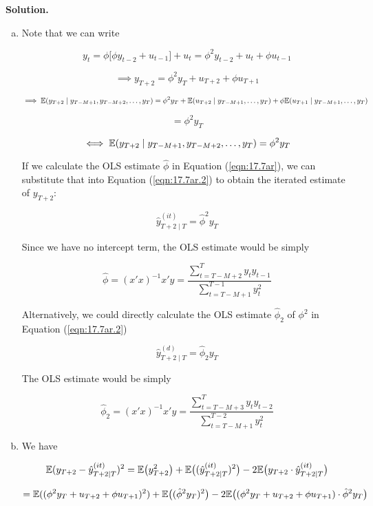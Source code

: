 \textbf{Solution.} 

\begin{enumerate}[(a)]

\item Note that we can write

\[
y_t =  \phi \big[\phi y_{t-2} + u_{t-1} \big] + u_t =  \phi^2y_{t-2} + u_t + \phi u_{t-1}
\]

\[
\implies y_{T+2} =  \phi^2y_{T} + u_{T+2} + \phi u_{T+1}
\]

\[
\implies \mathbb{E}(y_{T+2} \mid y_{T - M + 1}, y_{T-M + 2}, \ldots, y_T) =  \phi^2y_{T} +  \mathbb{E}(u_{T+2} \mid y_{T - M + 1}, \ldots, y_T) + \phi  \mathbb{E}( u_{T+1} \mid y_{T - M + 1}, \ldots, y_T)
\]

\[
 = \phi^2y_{T}
\]

\begin{equation} \label{eqn:17.7ar.2}
\iff  \mathbb{E}(y_{T+2} \mid y_{T - M + 1}, y_{T-M + 2}, \ldots, y_T) = \phi^2y_{T}
\end{equation}

If we calculate the OLS estimate \(\hat{\phi}\) in Equation (\ref{eqn:17.7ar}), we can substitute that into Equation (\ref{eqn:17.7ar.2}) to obtain the iterated estimate of \(y_{T+2}\):

\[
\hat{y}_{T+2\mid T}^{(it)} = \hat{\phi}^2y_{T}
\]

Since we have no intercept term, the OLS estimate would be simply

\[
\hat{\phi} = (x'x)^{-1}x'y = \frac{\sum_{t=T-M+2}^{T} y_t y_{t-1}}{\sum_{t=T-M+1}^{T-1} y_t^2}
\]

Alternatively, we could directly calculate the OLS estimate \(\hat{\phi}_2\) of \(\phi^2\) in Equation (\ref{eqn:17.7ar.2})

\[
\hat{y}_{T+2\mid T}^{(d)} = \hat{\phi}_2y_{T}
\]

The OLS estimate would be simply

\[
\hat{\phi}_2 = (x'x)^{-1}x'y = \frac{\sum_{t=T-M+3}^{T} y_t y_{t-2}}{\sum_{t=T-M+1}^{T-2} y_t^2}
\]

\item We have

\[
\mathbb{E}(y_{T+2} - \hat{y}_{T+2\mid T}^{(it)})^2 = \mathbb{E}\big(y_{T+2}^2\big) + \mathbb{E} \big((\hat{y}_{T+2\mid T}^{(it)})^2 \big)  -2 \mathbb{E} \big(y_{T+2} \cdot \hat{y}_{T+2\mid T}^{(it)}\big) 
\]

\[
= \mathbb{E}((\phi^2 y_T + u_{T+2} + \phi u_{T+1})^2) + \mathbb{E} \big((\hat{\phi}^2y_{T})^2 \big)  -2 \mathbb{E} \big((\phi^2 y_T + u_{T+2} + \phi u_{T+1}) \cdot \hat{\phi}^2y_{T}\big) 
\]


\end{enumerate}
